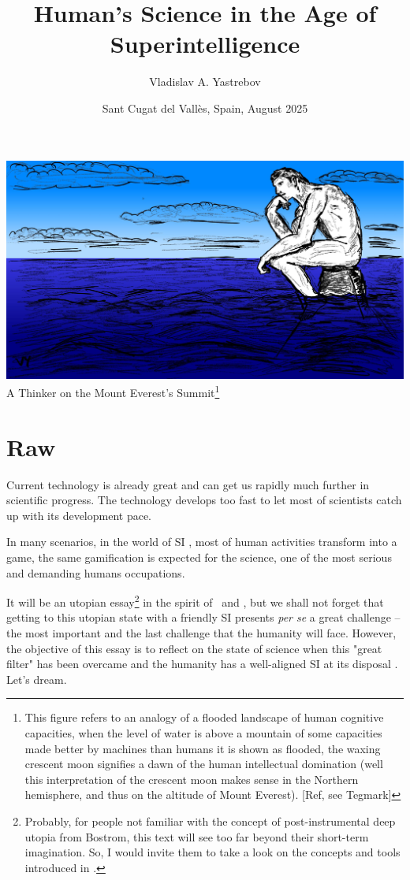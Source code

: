 \documentclass[a4paper,11pt]{article}
\title{Human's Science in the Age of Superintelligence}
\author{Vladislav A. Yastrebov}
\date{Sant Cugat del Vall\`es, Spain, August 2025}
\begin{document}
\maketitle
\begin{center}
    \includegraphics[width=1\textwidth]{Fig_SI_2.jpg}
    \footnotesize A Thinker on the Mount Everest's Summit\footnote{This figure refers to an analogy of a flooded landscape of human cognitive capacities, when the level of water is above a mountain of some capacities made better by machines than humans it is shown as flooded, the waxing crescent moon signifies a dawn of the human intellectual domination (well this interpretation of the crescent moon makes sense in the Northern hemisphere, and thus on the altitude of Mount Everest). [Ref, see Tegmark] }
\end{center}
    \newpage
 	\tableofcontents


    \printnomenclature

    \section{Raw}

    Current technology is already great and can get us rapidly much further in scientific progress. The technology develops too fast to let most of scientists catch up with its development pace.

    In many scenarios, in the world of SI , most of human activities transform into a game, the same gamification is expected for the science, one of the most serious and demanding humans occupations.
    
    It will be an utopian essay\footnote{Probably, for people not familiar with the concept of post-instrumental deep utopia from Bostrom, this text will see too far beyond their short-term imagination. So, I would invite them to take a look on the concepts and tools introduced in \textcite{DeepUtopia}.} in the spirit of~\parencite{DeepUtopia} and \parencite{LovingGrace}, but we shall not forget that getting to this utopian state with a friendly SI presents \textit{per se} a great challenge -- the most important and the last challenge that the humanity will face. However, the objective of this essay is to reflect on the state of science when this "great filter" has been overcame and the humanity has a well-aligned SI at its disposal \parencite{Yudkowsky2008,Yampolskiy2016,Yudkowsky2022}. Let's dream.
\end{document}
